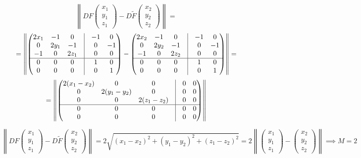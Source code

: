 \documentclass[11pt]{article}
\begin{document}
\[
\left\| DF \begin{pmatrix}
    x_1 \\
    y_1 \\
    z_1
\end{pmatrix} - D \tilde{F} \begin{pmatrix}
    x_2 \\
    y_2 \\
    z_2
\end{pmatrix} \right\| =
\]
\[
= \left\| \begin{pmatrix}
    2x_1 & -1 & 0 & \vline & -1 & 0 \\
    0 & 2y_1 & -1 & \vline & 0 & -1 \\
    -1 & 0 & 2z_1 & \vline & 0 & 0 \\
    \hline
    0 & 0 & 0 & \vline & 1 & 0 \\
    0 & 0 & 0 & \vline & 0 & 1
\end{pmatrix} - \begin{pmatrix}
    2x_2 & -1 & 0 & \vline & -1 & 0 \\
    0 & 2y_2 & -1 & \vline & 0 & -1 \\
    -1 & 0 & 2z_2 & \vline & 0 & 0 \\
    \hline
    0 & 0 & 0 & \vline & 1 & 0 \\
    0 & 0 & 0 & \vline & 0 & 1
\end{pmatrix} \right\| = 
\]
\[
= \left\| \begin{pmatrix}
    2(x_1 - x_2) & 0 & 0 & \vline & 0 & 0 \\
    0 & 2(y_1 - y_2) & 0 & \vline & 0 & 0 \\
    0 & 0 & 2(z_1 - z_2) & \vline & 0 & 0 \\
    \hline
    0 & 0 & 0 & \vline & 0 & 0 \\
    0 & 0 & 0 & \vline & 0 & 0
\end{pmatrix} \right\|
\]

\[
\left\| DF \begin{pmatrix}
    x_1 \\
    y_1 \\
    z_1
\end{pmatrix} - D \tilde{F} \begin{pmatrix}
    x_2 \\
    y_2 \\
    z_2
\end{pmatrix} \right\| = 2 \sqrt{(x_1 - x_2)^2 + (y_1 - y_2)^2 + (z_1 - z_2)^2} = 2 \left\| \begin{pmatrix}
    x_1 \\
    y_1 \\
    z_1
\end{pmatrix} - \begin{pmatrix}
    x_2 \\
    y_2 \\
    z_2
\end{pmatrix} \right\| \implies M = 2
\]
\end{document}
